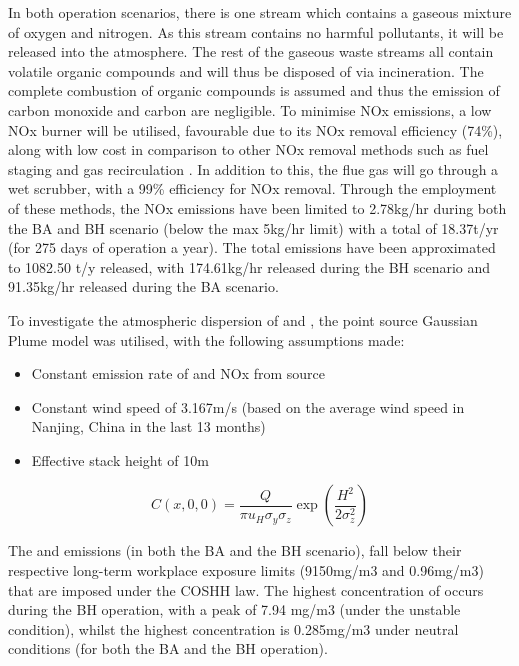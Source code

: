 In both operation scenarios, there is one stream which contains a gaseous mixture of oxygen and nitrogen. As this stream contains no harmful pollutants, it will be released into the atmosphere. The rest of the gaseous waste streams all contain volatile organic compounds and will thus be disposed of via incineration. The complete combustion of organic compounds is assumed and thus the emission of carbon monoxide and carbon are negligible. To minimise NOx emissions, a low NOx burner will be utilised, favourable due to its NOx removal efficiency (74\%), along with low cost in comparison to other NOx removal methods such as fuel staging and gas recirculation \cite{world_bank_group_pollution_1999}. In addition to this, the flue gas will go through a wet scrubber, with a 99\% efficiency for NOx removal. Through the employment of these methods, the NOx emissions have been limited to 2.78kg/hr during both the BA and BH scenario (below the max 5kg/hr limit) with a total of 18.37t/yr (for 275 days of operation a year). The total  emissions have been approximated to 1082.50 t/y released, with 174.61kg/hr released during the BH scenario and 91.35kg/hr released during the BA scenario. %

To investigate the atmospheric dispersion of  and , the point source Gaussian Plume model was utilised, with the following assumptions made:

\begin{itemize}
\item Constant emission rate of  and NOx from source
\item Constant wind speed of 3.167m/s (based on the average wind speed in Nanjing, China in the last 13 months)
\item  Effective stack height of 10m 
\end{itemize}

\begin{equation}
C(x,0,0)= \frac{Q}{\pi u_{H} \sigma_{y} \sigma_{z}} \exp\left( \frac{H^2}{2\sigma_{z}^2}\right)
\end{equation}


The  and  emissions (in both the BA and the BH scenario), fall below their respective long-term workplace exposure limits (9150mg/m3 and 0.96mg/m3) that are imposed under the COSHH law. The highest concentration of  occurs during the BH operation, with a peak of 7.94 mg/m3  (under the unstable condition), whilst the highest  concentration is 0.285mg/m3 under neutral conditions (for both the BA and the BH operation). 

